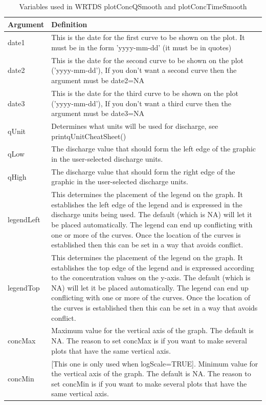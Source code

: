 \documentclass[a4paper,11pt]{article}\usepackage[]{graphicx}\usepackage[]{color}
\begin{document}
\begin{table}[ht]
\caption{Variables used in WRTDS plotConcQSmooth and plotConcTimeSmooth \label{tab:wrtdsMultiVariables}}
\begin{tabularx}{\textwidth}{lX}
\hline
  \textbf{Argument} & \textbf{Definition} \\
\hline
date1 & This is the date for the first curve to be shown on the plot.  It must be in the form 'yyyy-mm-dd' (it must be in quotes)\\
date2 & This is the date for the second curve to be shown on the plot ('yyyy-mm-dd'), If you don't want a second curve then the argument must be date2=NA\\
date3 & This is the date for the third curve to be shown on the plot ('yyyy-mm-dd'), If you don't want a third curve then the argument must be date3=NA\\
qUnit & Determines what units will be used for discharge, see printqUnitCheatSheet() \\
qLow & The discharge value that should form the left edge of the graphic in the user-selected discharge units. \\
qHigh & The discharge value that should form the right edge of the graphic in the user-selected discharge units. \\
legendLeft & This determines the placement of the legend on the graph.  It establishes the left edge of the legend and is expressed in the discharge units being used.  The default (which is NA) will let it be placed automatically.  The legend can end up conflicting with one or more of the curves.  Once the location of the curves is established then this can be set in a way that avoids conflict.\\
legendTop & This determines the placement of the legend on the graph.  It establishes the top edge of the legend and is expressed according to the concentration values on the y-axis.  The default (which is NA) will let it be placed automatically.  The legend can end up conflicting with one or more of the curves.  Once the location of the curves is established then this can be set in a way that avoids conflict.\\
concMax & Maximum value for the vertical axis of the graph.  The default is NA.  The reason to set concMax is if you want to make several plots that have the same vertical axis.\\
concMin & [This one is only used when logScale=TRUE].  Minimum value for the vertical axis of the graph.  The default is NA.  The reason to set concMin is if you want to make several plots that have the same vertical axis.\\

\end{tabularx}
\end{table}
\end{document}
